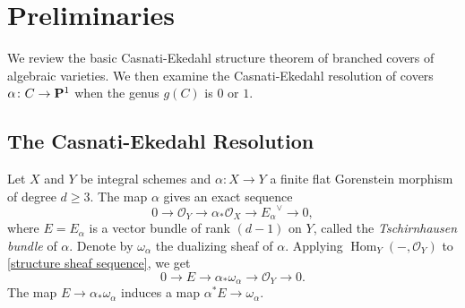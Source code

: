 \documentclass[11pt, two side, letterpaper, final]{amsart}
\renewcommand{\P}{{\bf P}}
\newcommand {\from}{\colon}
\DeclareMathOperator{\Hom}{Hom}
\newcommand{\cO}{\mathcal{O}}
\newcommand{\cE}{E}
\begin{document}
\section{Preliminaries}
\label{sec:preliminaries}
We review the basic Casnati-Ekedahl structure theorem of branched covers of algebraic varieties. We then examine the Casnati-Ekedahl resolution of covers $\alpha \from C \to \P^1$ when the genus $g(C)$ is $0$ or $1$. 
\subsection{The Casnati-Ekedahl Resolution}
 Let $X$ and $Y$ be integral schemes and $\alpha \from X \to Y$ a finite flat Gorenstein morphism of degree $d \geq 3$. The map $\alpha$ gives an exact sequence
\begin{equation}\label{structure sheaf sequence}
  0 \to \cO_Y \to \alpha_* \cO_X \to {\cE_\alpha}^\vee \to 0,
\end{equation}
where $\cE = \cE_\alpha$ is a vector bundle of rank $(d-1)$ on $Y$, called the \emph{Tschirnhausen bundle} of $\alpha$. Denote by $\omega_\alpha$ the dualizing sheaf of $\alpha$. Applying $\Hom_Y(-,\cO_Y)$ to \eqref{structure sheaf sequence}, we get
\begin{equation}\label{dual structure sheaf sequence}
  0 \to \cE \to \alpha_* \omega_\alpha \to \cO_Y \to 0.
\end{equation}
The map $\cE \to \alpha_* \omega_\alpha$ induces a map $\alpha^* \cE \to \omega_\alpha$. 
\end{document}
